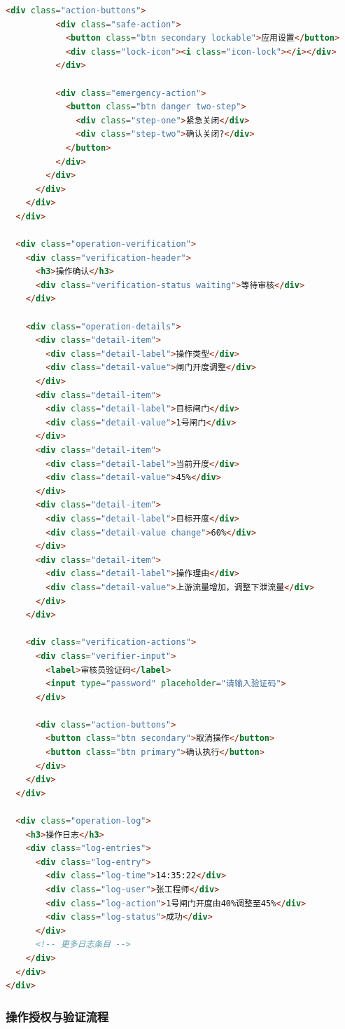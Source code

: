 \begin{lstlisting}[language=HTML]
        <div class="action-buttons">
          <div class="safe-action">
            <button class="btn secondary lockable">应用设置</button>
            <div class="lock-icon"><i class="icon-lock"></i></div>
          </div>
          
          <div class="emergency-action">
            <button class="btn danger two-step">
              <div class="step-one">紧急关闭</div>
              <div class="step-two">确认关闭?</div>
            </button>
          </div>
        </div>
      </div>
    </div>
  </div>
  
  <div class="operation-verification">
    <div class="verification-header">
      <h3>操作确认</h3>
      <div class="verification-status waiting">等待审核</div>
    </div>
    
    <div class="operation-details">
      <div class="detail-item">
        <div class="detail-label">操作类型</div>
        <div class="detail-value">闸门开度调整</div>
      </div>
      <div class="detail-item">
        <div class="detail-label">目标闸门</div>
        <div class="detail-value">1号闸门</div>
      </div>
      <div class="detail-item">
        <div class="detail-label">当前开度</div>
        <div class="detail-value">45%</div>
      </div>
      <div class="detail-item">
        <div class="detail-label">目标开度</div>
        <div class="detail-value change">60%</div>
      </div>
      <div class="detail-item">
        <div class="detail-label">操作理由</div>
        <div class="detail-value">上游流量增加，调整下泄流量</div>
      </div>
    </div>
    
    <div class="verification-actions">
      <div class="verifier-input">
        <label>审核员验证码</label>
        <input type="password" placeholder="请输入验证码">
      </div>
      
      <div class="action-buttons">
        <button class="btn secondary">取消操作</button>
        <button class="btn primary">确认执行</button>
      </div>
    </div>
  </div>
  
  <div class="operation-log">
    <h3>操作日志</h3>
    <div class="log-entries">
      <div class="log-entry">
        <div class="log-time">14:35:22</div>
        <div class="log-user">张工程师</div>
        <div class="log-action">1号闸门开度由40%调整至45%</div>
        <div class="log-status">成功</div>
      </div>
      <!-- 更多日志条目 -->
    </div>
  </div>
</div>
\end{lstlisting}

\subsubsection{操作授权与验证流程}\label{ux64cdux4f5cux6388ux6743ux4e0eux9a8cux8bc1ux6d41ux7a0b}

